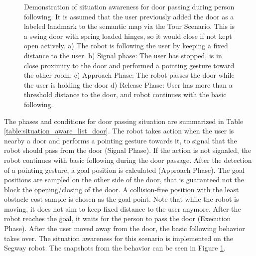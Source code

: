 \begin{figure}[ht!]
{        }
    \caption{Demonstration of situation awareness for door passing during person following. It is assumed that the user previously added the door as a labeled landmark to the semantic map via the Tour Scenario. This is a swing door with spring loaded hinges, so it would close if not kept open actively. a) The robot is following the user by keeping a fixed distance to the user. b) Signal phase: The user has stopped, is in close proximity to the door and performed a pointing gesture toward the other room. c) Approach Phase: The robot passes the door while the user is holding the door d) Release Phase: User has more than a threshold distance to the door, and robot continues with the basic following.}
   \label{fig:situtation_aware_door_passing}
\end{figure}

The phases and conditions for door passing situation are summarized in Table \ref{table:situation_aware_list_door}. The robot takes action when the user is nearby a door and performs a pointing gesture towards it, to signal that the robot should pass from the door (Signal Phase). If the action is not signaled, the robot continues with basic following during the door passage. After the detection of a pointing gesture, a goal position is calculated (Approach Phase). The goal positions are sampled on the other side of the door, that is guaranteed not the block the opening/closing of the door. A collision-free position with the least obstacle cost sample is chosen as the goal point. Note that while the robot is moving, it does not aim to keep fixed distance to the user anymore. After the robot reaches the goal, it waits for the person to pass the door (Execution Phase). After the user moved away from the door, the basic following behavior takes over. The situation awareness for this scenario is implemented on the Segway robot. The snapshots from the behavior can be seen in Figure \ref{fig:situtation_aware_door_passing}.